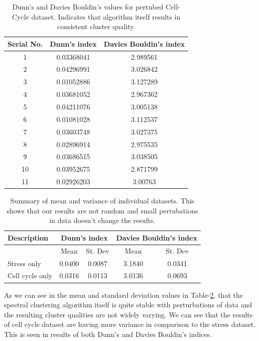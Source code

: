 \begin{table}
\centering
\begin{tabular}{|c|c|c|}
\hline
Serial No. & Dunn’s index  & Davies Bouldin’s index\\
\hline
1 & 0.03368041 & 2.989561 \\
2 & 0.04296991 & 3.026842 \\
3 & 0.01052886 & 3.127289 \\
4 & 0.03681052 & 2.967362 \\
5 & 0.04211076 & 3.005138 \\
6 & 0.01081028 & 3.112537 \\
7 & 0.03603748 & 3.027375 \\
8 & 0.02896914 & 2.975535 \\
9 & 0.03686515 & 3.038505 \\
10 & 0.03952675 & 2.871799 \\
11 & 0.02926203 & 3.00763 \\
\hline 
\end{tabular}
\caption{Dunn's and Davies Bouldin's values for pertubed Cell-Cycle dataset. Indicates that algorithm itself results in consistent cluster quality.}
\label{tab:cellcycle_only_perturb}
\end{table}

\begin{table}
\centering
\begin{tabular}{|l|c|c|c|c|}
\hline
Description & \multicolumn{2}{|c|}{Dunn’s index}  & \multicolumn{2}{|c|}{Davies Bouldin’s index}\\
\hline
 & Mean & St. Dev & Mean & St. Dev\\
\hline
Stress only  & 0.0400 & 0.0087 & 3.1840 & 0.0341 \\
Cell cycle only & 0.0316 & 0.0113 & 3.0136 & 0.0693 \\
\hline 
\end{tabular}
\caption{Summary of mean and variance of individual datasets. This shows that our results are not random and small pertubations in data doesn’t change the results.}
\label{tab:stress_ccycle_perturb}
\end{table}

As we can see in the mean and standard deviation values in Table-\ref{tab:stress_ccycle_perturb}, that the spectral clustering algorithm itself is quite stable with perturbations of 
data and the resulting cluster qualities are not widely varying. We can see that the results of cell cycle dataset are having more variance in comparison to the stress dataset. This is seen in results of both Dunn's and Davies Bouldin's indices.

